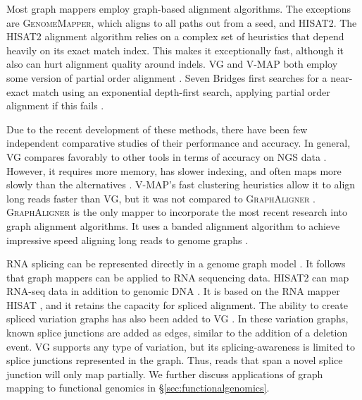 Most graph mappers employ graph-based alignment algorithms. 
The exceptions are \textsc{GenomeMapper}, which aligns to all paths out from a seed, and \textsc{HISAT2}.
The \textsc{HISAT2} alignment algorithm relies on a complex set of heuristics that depend heavily on its exact match index.
This makes it exceptionally fast, although it also can hurt alignment quality around indels. 
\textsc{VG} and \textsc{V-MAP} both employ some version of partial order alignment \cite{Garrison_2019, Vaddadi_2019}.
Seven Bridges first searches for a near-exact match using an exponential depth-first search, applying partial order alignment if this fails \cite{Rakocevic_2019}.

Due to the recent development of these methods, there have been few independent comparative studies of their performance and accuracy.
In general, \textsc{VG} compares favorably to other tools in terms of accuracy on NGS data \cite{Rand_2017}. 
However, it requires more memory, has slower indexing, and often maps more slowly than the alternatives \cite{Kim_2019, Vaddadi_2019}. 
\textsc{V-MAP}'s fast clustering heuristics allow it to align long reads faster than \textsc{VG}, but it was not compared to \textsc{GraphAligner} \cite{Vaddadi_2019}.
\textsc{GraphAligner} is the only mapper to incorporate the most recent research into graph alignment algorithms.
It uses a banded alignment algorithm to achieve impressive speed aligning long reads to genome graphs \cite{Rautiainen_2019b}.

RNA splicing can be represented directly in a genome graph model \cite{Lee_2002}.
It follows that graph mappers can be applied to RNA sequencing data.
\textsc{HISAT2} can map RNA-seq data in addition to genomic DNA \cite{Kim_2019}.
It is based on the RNA mapper \textsc{HISAT} \cite{Kim_2015}, and it retains the capacity for spliced alignment.
The ability to create spliced variation graphs has also been added to VG \cite{Garrison_2018}. 
In these variation graphs, known splice junctions are added as edges, similar to the addition of a deletion event.
\textsc{VG} supports any type of variation, but its splicing-awareness is limited to splice junctions represented in the graph.
Thus, reads that span a novel splice junction will only map partially.
We further discuss applications of graph mapping to functional genomics in \S \ref{sec:functionalgenomics}.

